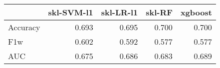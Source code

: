 \begin{tabular}{lrrrr}
\toprule
{} &  skl-SVM-l1 &  skl-LR-l1 &  skl-RF &  xgboost \\
\midrule
Accuracy &       0.693 &      0.695 &   0.700 &    0.700 \\
F1w      &       0.602 &      0.592 &   0.577 &    0.577 \\
AUC      &       0.675 &      0.686 &   0.683 &    0.689 \\
\bottomrule
\end{tabular}
